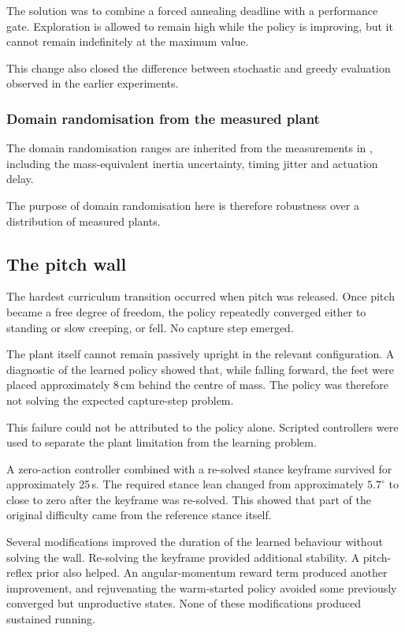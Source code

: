 The solution was to combine a forced annealing deadline with a performance gate.
Exploration is allowed to remain high while the policy is improving, but it cannot remain indefinitely at the maximum value.

This change also closed the difference between stochastic and greedy evaluation observed in the earlier experiments.

\subsubsection{Domain randomisation from the measured plant}

The domain randomisation ranges are inherited from the measurements in , including the mass-equivalent inertia uncertainty, timing jitter and actuation delay.

The purpose of domain randomisation here is therefore robustness over a distribution of measured plants.

\subsection{The pitch wall}

\label{sec:rl-pitch-wall}

The hardest curriculum transition occurred when pitch was released.
Once pitch became a free degree of freedom, the policy repeatedly converged either to standing or slow creeping, or fell.
No capture step emerged.

The plant itself cannot remain passively upright in the relevant configuration.
A diagnostic of the learned policy showed that, while falling forward, the feet were placed approximately 8\,cm behind the centre of mass.
The policy was therefore not solving the expected capture-step problem.

This failure could not be attributed to the policy alone.
Scripted controllers were used to separate the plant limitation from the learning problem.

A zero-action controller combined with a re-solved stance keyframe survived for approximately 25\,s.
The required stance lean changed from approximately $5.7^\circ$ to close to zero after the keyframe was re-solved.
This showed that part of the original difficulty came from the reference stance itself.

Several modifications improved the duration of the learned behaviour without solving the wall.
Re-solving the keyframe provided additional stability.
A pitch-reflex prior also helped.
An angular-momentum reward term produced another improvement, and rejuvenating the warm-started policy avoided some previously converged but unproductive states.
None of these modifications produced sustained running.

